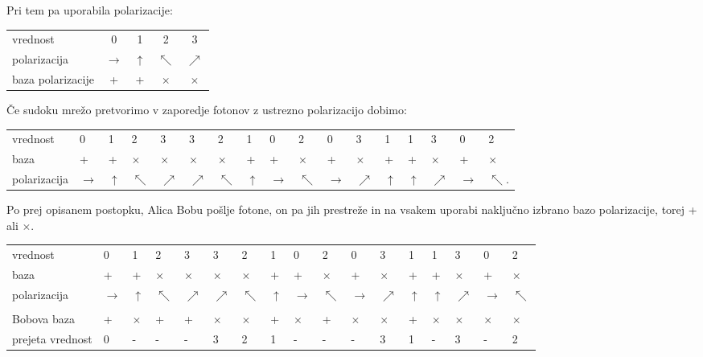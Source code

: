 \documentclass[A4paper, 11pt]{article}
\begin{document}
Pri tem pa uporabila polarizacije:

\begin{center}
\begin{tabular}{l c c c c}
vrednost & 0 & 1 & 2 & 3\\
polarizacija & $\rightarrow$ & $\uparrow$ & $\nwarrow$ & $\nearrow$\\
baza polarizacije & + & + & $\times$ & $\times$\\
\end{tabular}
\end{center}

Če sudoku mrežo pretvorimo v zaporedje fotonov z ustrezno polarizacijo dobimo:

\begin{center}
\begin{tabular}{l m{0.2 cm} m{0.2 cm} m{0.2 cm} m{0.2 cm} m{0.2 cm} m{0.2 cm} m{0.2 cm} m{0.2 cm} m{0.2 cm} m{0.2 cm} m{0.2 cm} m{0.2 cm} m{0.2 cm} m{0.2 cm} m{0.2 cm} m{0.2 cm}}
vrednost & 0 & 1 & 2 & 3 & 3 & 2 & 1 & 0 & 2 & 0 & 3 & 1 & 1 & 3 & 0 & 2\\
baza & + & + & $\times$ & $\times$ & $\times$ & $\times$ & + & + & $\times$ & + & $\times$ & + & + & $\times$ & + & $\times$\\
polarizacija & $\rightarrow$ & $\uparrow$ & $\nwarrow$ & $\nearrow$ & $\nearrow$ & $\nwarrow$ & $\uparrow$ & $\rightarrow$ & $\nwarrow$ & $\rightarrow$ & $\nearrow$ & $\uparrow$ & $\uparrow$ & $\nearrow$ & $\rightarrow$ & $\nwarrow$.
\end{tabular}
\end{center}

Po prej opisanem postopku, Alica Bobu pošlje fotone, on pa jih prestreže in na vsakem uporabi naključno izbrano bazo polarizacije, torej + ali $\times$. 

\begin{center}
\begin{tabular}{l m{0.2 cm} m{0.2 cm} m{0.2 cm} m{0.2 cm} m{0.2 cm} m{0.2 cm} m{0.2 cm} m{0.2 cm} m{0.2 cm} m{0.2 cm} m{0.2 cm} m{0.2 cm} m{0.2 cm} m{0.2 cm} m{0.2 cm} m{0.2 cm}}
vrednost & 0 & 1 & 2 & 3 & 3 & 2 & 1 & 0 & 2 & 0 & 3 & 1 & 1 & 3 & 0 & 2\\
baza & + & + & $\times$ & $\times$ & $\times$ & $\times$ & + & + & $\times$ & + & $\times$ & + & + & $\times$ & + & $\times$\\
polarizacija & $\rightarrow$ & $\uparrow$ & $\nwarrow$ & $\nearrow$ & $\nearrow$ & $\nwarrow$ & $\uparrow$ & $\rightarrow$ & $\nwarrow$ & $\rightarrow$ & $\nearrow$ & $\uparrow$ & $\uparrow$ & $\nearrow$ & $\rightarrow$ & $\nwarrow$\\
\\
Bobova baza & + & $\times$ & + & + & $\times$ & $\times$ & + & $\times$ & + & $\times$ & $\times$ & + & $\times$ & $\times$ & $\times$ & $\times$\\
prejeta vrednost & 0 & - & - & - & 3 & 2 & 1 & - & - & - & 3 & 1 & - & 3 & - & 2\\ 
\end{tabular}
\end{center}
\end{document}
